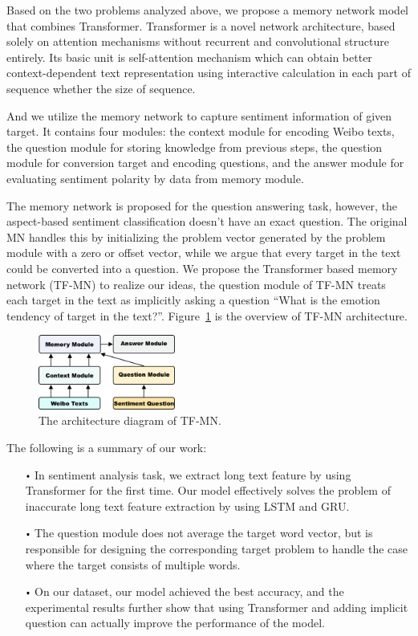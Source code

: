 \documentclass[runningheads, twocolumn]{llncs}
\begin{document}
Based on the two problems analyzed above, we propose a memory network model that combines Transformer. Transformer is a novel network architecture, based solely on attention mechanisms without recurrent and convolutional structure entirely. Its basic unit is self-attention mechanism which can obtain better context-dependent text representation using interactive calculation in each part of sequence whether the size of sequence.

And we utilize the memory network to capture sentiment information of given target. It contains four modules: the context module for encoding Weibo texts, the question module for storing knowledge from previous steps, the question module for conversion target and encoding questions, and the answer module for evaluating sentiment polarity by data from memory module.

The memory network is proposed for the question answering task, however, the aspect-based sentiment classification doesn’t have an exact question. The original MN handles this by initializing the problem vector generated by the problem module with a zero or offset vector, while we argue that every target in the text could be converted into a question. We propose the Transformer based memory network (TF-MN) to realize our ideas, the question module of TF-MN treats each target in the text as implicitly asking a question “What is the emotion tendency of target in the text?”. Figure~\ref{TF-MN} is the overview of TF-MN architecture.

\begin{figure}[htb]
	\includegraphics[width=0.4\textwidth]{TF-MN.png}
	\centering
	\caption{The architecture diagram of TF-MN.}\label{TF-MN}
\end{figure}

 The following is a summary of our work:

\begin{itemize}
	\item[$\vcenter{\hbox{\tiny$\bullet$}}$] In sentiment analysis task, we extract long text feature by using Transformer for the first time. Our model effectively solves the problem of inaccurate long text feature extraction by using LSTM and GRU.
	\item[$\vcenter{\hbox{\tiny$\bullet$}}$] The question module does not average the target word vector, but is responsible for designing the corresponding target problem to handle the case where the target consists of multiple words.
	\item[$\vcenter{\hbox{\tiny$\bullet$}}$] On our dataset, our model achieved the best accuracy, and the experimental results further show that using Transformer and adding implicit question can actually improve the performance of the model.
\end{itemize}
\end{document}

